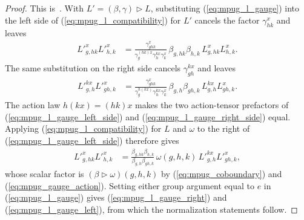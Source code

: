 \begin{proof}\leanok
    This is~\cite[``Joint scalar gauges preserve L-symbol
        compatibility'']{QICLean2026Blueprint}.
    With $L'=(\beta,\gamma)\mathbin{\triangleright}L$, substituting
    (\ref{eq:mpug_l_gauge}) into the left side of
    (\ref{eq:mpug_l_compatibility}) for $L'$ cancels the factor
    $\gamma^x_{hk}$ and leaves
    \begin{align}
        {L'}^x_{g,hk}{L'}^x_{h,k}
         & =\frac{\gamma^x_{ghk}}
        {\gamma^{(hk)x}_g\gamma^{k x}_h\gamma^x_k}\,
        \beta_{g,hk}\beta_{h,k}\,L^x_{g,hk}L^x_{h,k}.
        \label{eq:mpug_l_gauge_left_side}
    \end{align}
    The same substitution on the right side cancels
    $\gamma^{k x}_{gh}$ and leaves
    \begin{align}
        {L'}^{k x}_{g,h}{L'}^x_{gh,k}
         & =\frac{\gamma^x_{ghk}}
        {\gamma^{h(k x)}_g\gamma^{k x}_h\gamma^x_k}\,
        \beta_{g,h}\beta_{gh,k}\,L^{k x}_{g,h}L^x_{gh,k}.
        \label{eq:mpug_l_gauge_right_side}
    \end{align}
    The action law $h(k x)=(hk)x$ makes the two action-tensor prefactors of
    (\ref{eq:mpug_l_gauge_left_side}) and
    (\ref{eq:mpug_l_gauge_right_side}) equal. Applying
    (\ref{eq:mpug_l_compatibility}) for $L$ and $\omega$ to the right of
    (\ref{eq:mpug_l_gauge_left_side}) therefore gives
    \begin{align}
        {L'}^x_{g,hk}{L'}^x_{h,k}
         & =\frac{\beta_{g,hk}\beta_{h,k}}
        {\beta_{g,h}\beta_{gh,k}}\,\omega(g,h,k)\,
        {L'}^{k x}_{g,h}{L'}^x_{gh,k},
        \label{eq:mpug_l_gauge_compatibility}
    \end{align}
    whose scalar factor is
    $(\beta\mathbin{\triangleright}\omega)(g,h,k)$ by
    (\ref{eq:mpug_coboundary}) and
    (\ref{eq:mpug_gauge_action}). Setting either group argument equal
    to $e$ in (\ref{eq:mpug_l_gauge}) gives
    (\ref{eq:mpug_l_gauge_right}) and
    (\ref{eq:mpug_l_gauge_left}), from which the normalization statements
    follow.
\end{proof}

